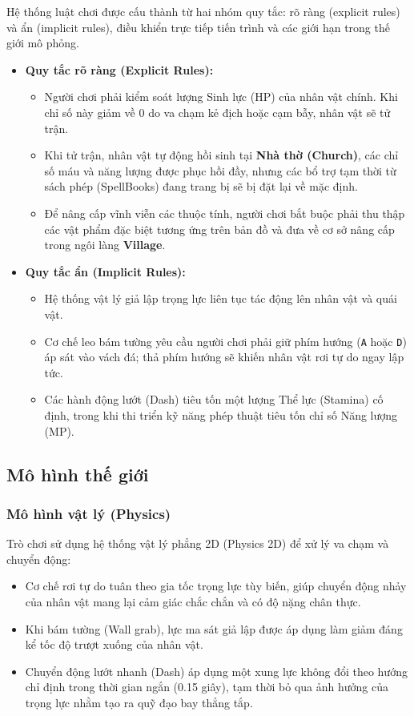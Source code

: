 \documentclass[../DoAn.tex]{subfiles}
\begin{document}
Hệ thống luật chơi được cấu thành từ hai nhóm quy tắc: rõ ràng (explicit rules) và ẩn (implicit rules), điều khiển trực tiếp tiến trình và các giới hạn trong thế giới mô phỏng.
\begin{itemize}
    \item \textbf{Quy tắc rõ ràng (Explicit Rules):}
    \begin{itemize}
        \item Người chơi phải kiểm soát lượng Sinh lực (HP) của nhân vật chính. Khi chỉ số này giảm về 0 do va chạm kẻ địch hoặc cạm bẫy, nhân vật sẽ tử trận.
        \item Khi tử trận, nhân vật tự động hồi sinh tại \textbf{Nhà thờ (Church)}, các chỉ số máu và năng lượng được phục hồi đầy, nhưng các bổ trợ tạm thời từ sách phép (SpellBooks) đang trang bị sẽ bị đặt lại về mặc định.
        \item Để nâng cấp vĩnh viễn các thuộc tính, người chơi bắt buộc phải thu thập các vật phẩm đặc biệt tương ứng trên bản đồ và đưa về cơ sở nâng cấp trong ngôi làng \textbf{Village}.
    \end{itemize}
    \item \textbf{Quy tắc ẩn (Implicit Rules):}
    \begin{itemize}
        \item Hệ thống vật lý giả lập trọng lực liên tục tác động lên nhân vật và quái vật.
        \item Cơ chế leo bám tường yêu cầu người chơi phải giữ phím hướng (\texttt{A} hoặc \texttt{D}) áp sát vào vách đá; thả phím hướng sẽ khiến nhân vật rơi tự do ngay lập tức.
        \item Các hành động lướt (Dash) tiêu tốn một lượng Thể lực (Stamina) cố định, trong khi thi triển kỹ năng phép thuật tiêu tốn chỉ số Năng lượng (MP).
    \end{itemize}
\end{itemize}

\subsection{Mô hình thế giới}
\label{subsection:3.3.2}

\subsubsection{Mô hình vật lý (Physics)}
Trò chơi sử dụng hệ thống vật lý phẳng 2D (Physics 2D) để xử lý va chạm và chuyển động:
\begin{itemize}
    \item Cơ chế rơi tự do tuân theo gia tốc trọng lực tùy biến, giúp chuyển động nhảy của nhân vật mang lại cảm giác chắc chắn và có độ nặng chân thực.
    \item Khi bám tường (Wall grab), lực ma sát giả lập được áp dụng làm giảm đáng kể tốc độ trượt xuống của nhân vật.
    \item Chuyển động lướt nhanh (Dash) áp dụng một xung lực không đổi theo hướng chỉ định trong thời gian ngắn (0.15 giây), tạm thời bỏ qua ảnh hưởng của trọng lực nhằm tạo ra quỹ đạo bay thẳng tắp.
\end{itemize}
\end{document}
